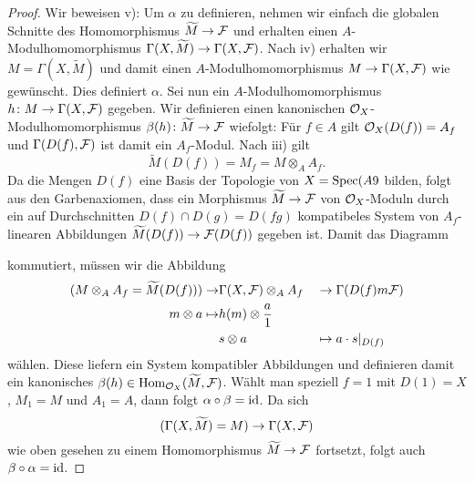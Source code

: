\begin{prop}
\begin{proof}
		Wir beweisen v): Um $\alpha$ zu definieren, nehmen wir einfach die globalen Schnitte des Homomorphismus $\widetilde{M}\to \mathcal{F}$ und erhalten einen $A$-Modulhomomorphismus $\Gamma(X,\widetilde{M}) \to \Gamma(X,\mathcal{F})$. Nach iv) erhalten wir $M = \Gamma(X,\widetilde{M})$ und damit einen $A$-Modulhomomorphismus $M \to \Gamma(X,\mathcal{F})$ wie gewünscht. Dies definiert $\alpha$. Sei nun ein $A$-Modulhomomorphismus $h\colon M \to \Gamma(X,\mathcal{F})$ gegeben. Wir definieren einen kanonischen $\mathcal{O}_X$-Modulhomomorphismus $\beta(h)\colon \widetilde{M}\to \mathcal{F}$ wiefolgt: Für $f \in A$ gilt $\mathcal{O}_X(D(f)) = A_f$ und $\Gamma(D(f),\mathcal{F})$ ist damit ein $A_f$-Modul. Nach iii) gilt
		\[
			\widetilde{M}(D(f)) = M_f = M \otimes_A A_f.
		\]
		Da die Mengen $D(f)$ eine Basis der Topologie von $X=\operatorname{Spec}(A9$ bilden, folgt aus den Garbenaxiomen, dass ein Morphismus $\widetilde{M}\to \mathcal{F}$ von $\mathcal{O}_X$-Moduln durch ein auf Durchschnitten $D(f)\cap D(g) = D(fg)$ kompatibeles System von $A_f$-linearen Abbildungen $\widetilde{M}(D(f)) \to \mathcal{F}(D(f))$ gegeben ist.
		Damit das Diagramm
		\begin{center}
		\end{center}
		kommutiert, müssen wir die Abbildung
		\begin{alignat*}{3}
			(M \otimes_A A_f = \widetilde{M}(D(f))) \to & \Gamma(X,\mathcal{F})\otimes_A A_f &&\to \Gamma(D(f)m\mathcal{F})\\
			m \otimes a \mapsto &  h(m)\otimes \frac{a}{1} && {}\\
			{} & s \otimes a && \mapsto a \cdot s\vert_{D(f)}
		\end{alignat*}
		wählen. Diese liefern ein System kompatibler Abbildungen und definieren damit ein kanonisches $\beta(h)\in \operatorname{Hom}_{\mathcal{O}_X}(\widetilde{M},\mathcal{F})$. Wählt man speziell $f=1$ mit $D(1) = X$, $M_1=M$ und $A_1 = A$, dann folgt $\alpha \circ \beta = \operatorname{id}$. Da sich
		\[
			(\Gamma(X,\widetilde{M}) = M) \to \Gamma(X,\mathcal{F})
		\]
		wie oben gesehen zu einem Homomorphismus $\widetilde{M} \to \mathcal{F}$ fortsetzt, folgt auch $\beta \circ \alpha = \operatorname{id}$.
	\end{proof}
\end{prop}

